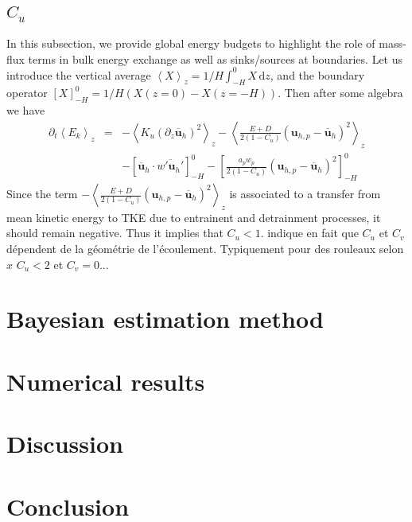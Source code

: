 \documentclass[draft]{agujournal2019}
\newcommand{\an}[1]{\ensuremath{\left\langle#1\right\rangle}} %
\newcommand{\sbra}[1]{\ensuremath{\left[#1\right]}} %
\newcommand{\dd}{\mathrm{d}}
\newcommand{\blu}[1]{{\color{BlueGreen} #1}}
\begin{document}
\subsection{$C_u$}
%
In this subsection, we provide global energy budgets to highlight the role of mass-flux terms in bulk energy 
exchange as well as sinks/sources at boundaries. Let us introduce the vertical average 
$\an{ X }_z = 1/H\int_{- H}^0 X  \, \dd z$, and the boundary operator
$\sbra{X}_{- H}^0 = 1/ H (X(z=0) - X(z=-H) )$. Then after some algebra we have
%
\begin{eqnarray*}
    \partial_t \an{ E_k }_z &=& - \an{  K_u (\partial_z \overline{\bm u}_h)^2  }_z - \an{ \frac{E + D}{2 (1-C_u) } (\bm u_{h,p} - \overline{\bm u}_h)^2 }_z 
\\
 &&  - \sbra{ \overline{\bm u}_h \cdot \overline{w'\bm u_h' } }_{- H}^0- \sbra{ \frac{a_p w_p}{2 (1- C_u)} (\bm u_{h,p} - \overline{\bm u}_h)^2  }_{- H}^0
\end{eqnarray*}
%
Since the term $- \an{ \frac{E + D}{2 (1-C_u) } (\bm u_{h,p} - \overline{\bm u}_h)^2 }_z $ is associated to a transfer from mean kinetic energy to TKE due to entrainent and detrainment processes, it should remain negative. Thus it implies that $C_u < 1$. \blu{\cite{wuEffectsVerticalWind1994} indique en fait que $C_u$ et $C_v$ dépendent de la géométrie de l'écoulement. Typiquement pour des rouleaux selon $x$ $C_u < 2$ et $C_v=0$...}


\section{Bayesian estimation method}

\section{Numerical results}

\section{Discussion}

\section{Conclusion}

%
\end{document}
